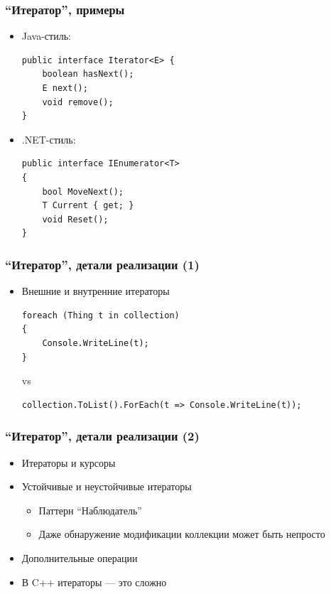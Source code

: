 \documentclass[xetex,mathserif,serif]{beamer}
\begin{document}
	\begin{frame}[fragile]
		\frametitle{``Итератор'', примеры}
		\begin{itemize}
			\item Java-стиль:
			\begin{verbatim}
public interface Iterator<E> {
    boolean hasNext();
    E next();
    void remove();
}
			\end{verbatim}
			\item .NET-стиль:
			\begin{verbatim}
public interface IEnumerator<T>
{
    bool MoveNext();
    T Current { get; }
    void Reset();
}
			\end{verbatim}
		\end{itemize}
	\end{frame}

	\begin{frame}[fragile]
		\frametitle{``Итератор'', детали реализации (1)}
		\begin{itemize}
			\item Внешние и внутренние итераторы
			\begin{verbatim}
foreach (Thing t in collection)
{
    Console.WriteLine(t);
} 
			\end{verbatim}
			vs
			\begin{verbatim}
collection.ToList().ForEach(t => Console.WriteLine(t));
			\end{verbatim}
		\end{itemize}
\end{frame}

	\begin{frame}
		\frametitle{``Итератор'', детали реализации (2)}
		\begin{itemize}
			\item Итераторы и курсоры
			\item Устойчивые и неустойчивые итераторы
			\begin{itemize}
				\item Паттерн ``Наблюдатель''
				\item Даже обнаружение модификации коллекции может быть непросто
			\end{itemize}
			\item Дополнительные операции
			\item В C++ итераторы --- это сложно
		\end{itemize}
	\end{frame}

\end{document}
